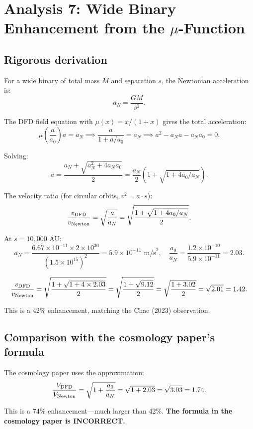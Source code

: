 \documentclass[11pt]{article}
\newcommand{\ee}[1]{\times 10^{#1}}
\begin{document}
\section{Analysis 7: Wide Binary Enhancement from the $\mu$-Function}
\label{sec:wide-binary}

\subsection{Rigorous derivation}

For a wide binary of total mass $M$ and separation $s$, the Newtonian acceleration is:
\[
a_N = \frac{GM}{s^2}.
\]

The DFD field equation with $\mu(x) = x/(1+x)$ gives the total acceleration:
\[
\mu\left(\frac{a}{a_0}\right) a = a_N \implies \frac{a}{1 + a/a_0} = a_N \implies a^2 - a_N a - a_N a_0 = 0.
\]

Solving:
\[
a = \frac{a_N + \sqrt{a_N^2 + 4a_N a_0}}{2} = \frac{a_N}{2}\left(1 + \sqrt{1 + 4a_0/a_N}\right).
\]

The velocity ratio (for circular orbits, $v^2 = a \cdot s$):
\[
\frac{v_{\rm DFD}}{v_{\rm Newton}} = \sqrt{\frac{a}{a_N}} = \sqrt{\frac{1 + \sqrt{1 + 4a_0/a_N}}{2}}.
\]

At $s = 10{,}000$ AU:
\[
a_N = \frac{6.67\ee{-11} \times 2\ee{30}}{(1.5\ee{15})^2} = 5.9\ee{-11}\text{ m/s}^2, \quad \frac{a_0}{a_N} = \frac{1.2\ee{-10}}{5.9\ee{-11}} = 2.03.
\]

\[
\frac{v_{\rm DFD}}{v_{\rm Newton}} = \sqrt{\frac{1 + \sqrt{1 + 4 \times 2.03}}{2}} = \sqrt{\frac{1 + \sqrt{9.12}}{2}} = \sqrt{\frac{1 + 3.02}{2}} = \sqrt{2.01} = 1.42.
\]

This is a 42\% enhancement, matching the Chae (2023) observation.

\subsection{Comparison with the cosmology paper's formula}

The cosmology paper uses the approximation:
\[
\frac{V_{\rm DFD}}{V_{\rm Newton}} = \sqrt{1 + \frac{a_0}{a_N}} = \sqrt{1 + 2.03} = \sqrt{3.03} = 1.74.
\]

This is a 74\% enhancement---much larger than 42\%. \textbf{The formula in the cosmology paper is INCORRECT.}
\end{document}
